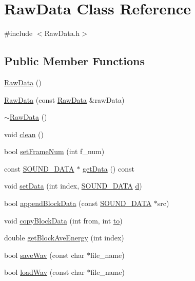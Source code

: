 \hypertarget{class_raw_data}{\section{Raw\+Data Class Reference}
\label{class_raw_data}
}


{\ttfamily \#include $<$Raw\+Data.\+h$>$}

\subsection*{Public Member Functions}
\begin{DoxyCompactItemize}
\item 
\hyperlink{class_raw_data_a583cd50c06a9fbaebdaaf44621401552}{Raw\+Data} ()
\item 
\hyperlink{class_raw_data_a9ebfa3736a2e278a34b169549d5efa3d}{Raw\+Data} (const \hyperlink{class_raw_data}{Raw\+Data} \&raw\+Data)
\item 
\hyperlink{class_raw_data_a214d10a81d07c892cb7b35653772e4e4}{$\sim$\+Raw\+Data} ()
\item 
void \hyperlink{class_raw_data_af1ad52746f7569118ece4f16fc8516d6}{clean} ()
\item 
bool \hyperlink{class_raw_data_a18c4c868312e7d850de4ff386e8698a0}{set\+Frame\+Num} (int f\+\_\+num)
\item 
const \hyperlink{configure__basic_8h_abf32ffaff24ba21700fbd0898b49ab02}{S\+O\+U\+N\+D\+\_\+\+D\+A\+T\+A} $\ast$ \hyperlink{class_raw_data_a166b59a84c19851aa2cd694d120d560f}{get\+Data} () const 
\item 
void \hyperlink{class_raw_data_a69101a0023281a035cd811f6858fea81}{set\+Data} (int index, \hyperlink{configure__basic_8h_abf32ffaff24ba21700fbd0898b49ab02}{S\+O\+U\+N\+D\+\_\+\+D\+A\+T\+A} \hyperlink{deltas_8m_ace9cdca9c1b355d9b321fd7f5ec2026b}{d})
\item 
bool \hyperlink{class_raw_data_af028c01fa2921829ff2f4a5e2c23da64}{append\+Block\+Data} (const \hyperlink{configure__basic_8h_abf32ffaff24ba21700fbd0898b49ab02}{S\+O\+U\+N\+D\+\_\+\+D\+A\+T\+A} $\ast$src)
\item 
void \hyperlink{class_raw_data_a003878d4445eed6fe8c21cb0d373e232}{copy\+Block\+Data} (int from, int \hyperlink{rastaplp_8m_a41c60bbfbe5db430f286f173be10a1e6}{to})
\item 
double \hyperlink{class_raw_data_a2a72d20d0fe44c15779f21d2b6f8baa9}{get\+Block\+Ave\+Energy} (int index)
\item 
bool \hyperlink{class_raw_data_a9459fcb81d0dd49a2ce8f0c164b1ffdc}{save\+Wav} (const char $\ast$file\+\_\+name)
\item 
bool \hyperlink{class_raw_data_ac6ec33dca034b3ae714f626bab48ac4a}{load\+Wav} (const char $\ast$file\+\_\+name)
\end{DoxyCompactItemize}
